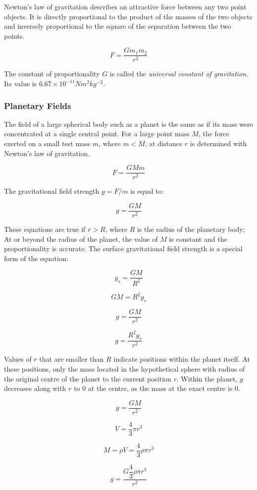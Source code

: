 \documentclass[12pt]{article}
\begin{document}
Newton's law of gravitation describes an attractive force between any two point objects. It is directly proportional to the product of the masses of the two objects and inversely proportional to the square of the separation between the two points.

\[F = \dfrac{Gm_1m_2}{r^2}\]

The constant of proportionality \(G\) is called the \emph{universal constant of gravitation}. Its value is \(6.67 \times 10^{-11} \text{} Nm^2kg^{-2}\).

\subsubsection{Planetary Fields}
\label{sec:org7f46114}

The field of a large spherical body such as a planet is the same as if its mass were concentrated at a single central point. For a large point mass \(M\), the force exerted on a small test mass \(m\), where \(m < M\), at distance \(r\) is determined with Newton's law of gravitation.

\[F = \dfrac{GMm}{r^2}\]

The gravitational field strength \(g = F / m\) is equal to:

\[g = \dfrac{GM}{r^2}\]

These equations are true if \(r > R\), where \(R\) is the radius of the planetary body; At or beyond the radius of the planet, the value of \(M\) is constant and the proportionality is accurate. The surface gravitational field strength is a special form of the equation:

\[g_s = \dfrac{GM}{R^2}\]

\[GM = R^2g_s \]

\[g = \dfrac{GM}{r^2}\]

\[g = \dfrac{R^2g_s}{r^2}\]

Values of \(r\) that are smaller than \(R\) indicate positions within the planet itself. At these positions, only the mass located in the hypothetical sphere with radius of the original centre of the planet to the current position \(r\). Within the planet, \(g\) decreases along with \(r\) to 0 at the centre, as the mass at the exact centre is 0.

\[g = \dfrac{GM}{r^2}\]

\[V = \dfrac{4}{3} \pi r^3\]

\[M = \rho V = \dfrac{4}{3} \rho \pi r^3\]

\[g = \dfrac{G \dfrac{4}{3} \rho \pi r^3}{r^2}\]
\end{document}
